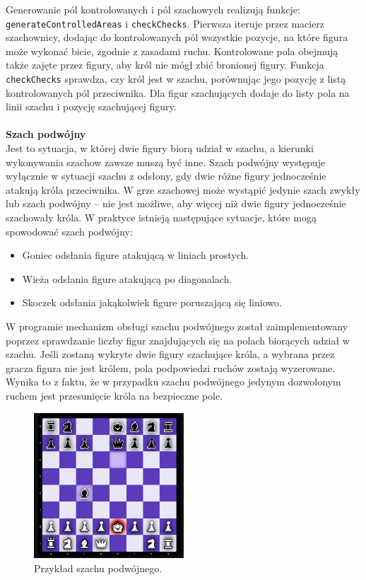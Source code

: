 \documentclass[12pt,a4paper]{article}
\begin{document}
\newpage

\noindent
Generowanie pól kontrolowanych i pól szachowych realizują funkcje: \texttt{generateControlledAreas} i \texttt{checkChecks}. Pierwsza iteruje przez macierz szachownicy, dodając do kontrolowanych pól wszystkie pozycje, na które figura może wykonać bicie, zgodnie z zasadami ruchu. Kontrolowane pola obejmują także zajęte przez figury, aby król nie mógł zbić bronionej figury. Funkcja \texttt{checkChecks} sprawdza, czy król jest w szachu, porównując jego pozycję z listą kontrolowanych pól przeciwnika. Dla figur szachujących dodaje do listy pola na linii szachu i pozycję szachującej figury.
\\\\

\noindent \textbf{Szach podwójny}\\
Jest to sytuacja, w której dwie figury biorą udział w szachu, a kierunki wykonywania szachow zawsze muszą być inne. Szach podwójny występuje wyłącznie w sytuacji szachu z odsłony, gdy dwie różne figury jednocześnie atakują króla przeciwnika. W grze szachowej może wystąpić jedynie szach zwykły lub szach podwójny – nie jest możliwe, aby więcej niż dwie figury jednocześnie szachowały króla. W praktyce istnieją następujące sytuacje, które mogą spowodować szach podwójny:

\begin{itemize}
    \item Goniec odsłania figure atakującą w liniach prostych.
    \item Wieża odsłania figure atakującą po diagonalach.
    \item Skoczek odsłania jakąkolwiek figure poruszającą się liniowo.
\end{itemize}

\noindent
W programie mechanizm obsługi szachu podwójnego został zaimplementowany poprzez sprawdzanie liczby figur znajdujących się na polach biorących udział w szachu. Jeśli zostaną wykryte dwie figury szachujące króla, a wybrana przez gracza figura nie jest królem, pola podpowiedzi ruchów zostają wyzerowane. Wynika to z faktu, że w przypadku szachu podwójnego jedynym dozwolonym ruchem jest przesunięcie króla na bezpieczne pole.

\vspace{0.5cm}
\begin{figure}[h!]
    \centering
    \includegraphics[width=0.5\textwidth]{images/imp_double_check.png}
    \caption{Przykład szachu podwójnego.}
\end{figure}
\end{document}
